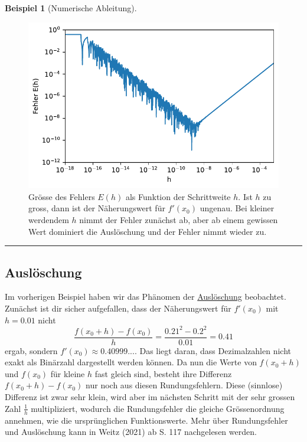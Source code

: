 \documentclass[
  a4paper,
  DIV=11]{scrreprt}
\theoremstyle{definition}
\theoremstyle{definition}
\newtheorem{example}{Beispiel}[chapter]
\theoremstyle{remark}
\begin{document}
\begin{example}[Numerische
Ableitung]
\begin{figure}[H]
{\centering \includegraphics{notAD_files/figure-pdf/fig-numdiffproblem-output-1.pdf}

}

\caption{\label{fig-numdiffproblem}Grösse des Fehlers \(E(h)\) als
Funktion der Schrittweite \(h\). Ist \(h\) zu gross, dann ist der
Näherungswert für \(f'(x_0)\) ungenau. Bei kleiner werdendem \(h\) nimmt
der Fehler zunächst ab, aber ab einem gewissen Wert dominiert die
Auslöschung und der Fehler nimmt wieder zu.}

\end{figure}

\end{example}

\begin{center}\rule{0.5\linewidth}{0.5pt}\end{center}

\hypertarget{ausluxf6schung}{%
\subsection{Auslöschung}\label{ausluxf6schung}}

Im vorherigen Beispiel haben wir das Phänomen der
\href{https://de.wikipedia.org/wiki/Ausl\%C3\%B6schung_(numerische_Mathematik)}{Auslöschung}
beobachtet. Zunächst ist dir sicher aufgefallen, dass der Näherungswert
für \(f'(x_0)\) mit \(h=0.01\) nicht
\[ \frac{f(x_0 + h) - f(x_0)}{h} = \frac{0.21^2 - 0.2^2}{0.01}=0.41\]
ergab, sondern \(f'(x_0)\approx 0.40999...\). Das liegt daran, dass
Dezimalzahlen nicht exakt als Binärzahl dargestellt werden können. Da
nun die Werte von \(f(x_0 + h)\) und \(f(x_0)\) für kleine \(h\) fast
gleich sind, besteht ihre Differenz \(f(x_0 + h) - f(x_0)\) nur noch aus
diesen Rundungsfehlern. Diese (sinnlose) Differenz ist zwar sehr klein,
wird aber im nächsten Schritt mit der sehr grossen Zahl \(\frac{1}{h}\)
multipliziert, wodurch die Rundungsfehler die gleiche Grössenordnung
annehmen, wie die ursprünglichen Funktionswerte. Mehr über
Rundungsfehler und Auslöschung kann in Weitz (2021) ab S. 117
nachgelesen werden.
\end{document}
